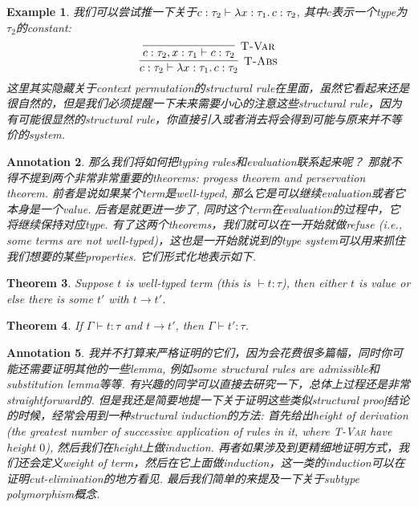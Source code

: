 \documentclass{article}
\newtheorem{theorem}{Theorem}[section]
\newtheorem{example}[theorem]{Example}
\newtheorem{annotation}[theorem]{Annotation}
\newcommand{\lam}[2]{\ensuremath{\lambda #1\ldotp #2}} %
\newcommand{\termtype}[2]{\ensuremath{#1:#2}}
\begin{document}
\begin{example}
\rm 我们可以尝试推一下关于$\termtype{c}{\tau_2}\vdash \termtype{\lam{\termtype{x}{\tau_1}}{c}}{\tau_2}$, 其中$c$表示一个type为$\tau_2$的constant:
\[
	\infer[\textsc{T-Abs}]{\termtype{c}{\tau_2}\vdash \termtype{\lam{\termtype{x}{\tau_1}}{c}}{\tau_2}}{\infer[\textsc{T-Var}]{\termtype{c}{\tau_2},\termtype{x}{\tau_1} \vdash \termtype{c}{\tau_2}}{}}
\]
这里其实隐藏关于context permutation的structural rule在里面，虽然它看起来还是很自然的，但是我们必须提醒一下未来需要小心的注意这些structural rule，因为有可能很显然的structural rule，你直接引入或者消去将会得到可能与原来并不等价的system.  
\end{example}

\begin{annotation}
\rm 那么我们将如何把typing rules和evaluation联系起来呢？ 那就不得不提到两个非常非常重要的theorems: \emph{progess theorem} and \emph{perservation theorem}. 前者是说如果某个term是well-typed, 那么它是可以继续evaluation或者它本身是一个value. 后者是就更进一步了, 同时这个term在evaluation的过程中，它将继续保持对应type. 有了这两个theorems，我们就可以在一开始就做refuse (i.e., some terms are not well-typed)，这也是一开始就说到的type system可以用来抓住我们想要的某些properties. 它们形式化地表示如下.
\end{annotation}

\begin{theorem}
\rm Suppose $t$ is well-typed term (this is $\vdash \termtype{t}{\tau}$), then either $t$ is value or else there is some $t'$ with $t \to t'$. 
\end{theorem}

\begin{theorem}
\rm If $\Gamma \vdash \termtype{t}{\tau}$ and $t \to t'$, then $\Gamma \vdash \termtype{t'}{\tau}$. 
\end{theorem}

\begin{annotation}
\rm 我并不打算来严格证明的它们，因为会花费很多篇幅，同时你可能还需要证明其他的一些lemma, 例如some structural rules are admissible和substitution lemma等等. 有兴趣的同学可以直接去研究一下，总体上过程还是非常straightforward的. 但是我还是简要地提一下关于证明这些类似structural proof结论的时候，经常会用到一种structural induction的方法: 首先给出height of derivation (the greatest number of successive application of rules in it, where \textsc{T-Var} have height $0$), 然后我们在height上做induction. 再者如果涉及到更精细地证明方式，我们还会定义weight of term，然后在它上面做induction，这一类的induction可以在证明cut-elimination的地方看见. 最后我们简单的来提及一下关于\emph{subtype polymorphism}概念. 
\end{annotation}
\end{document}
